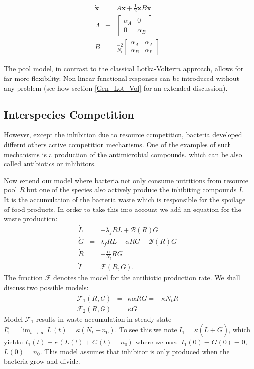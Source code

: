 \documentclass[10pt,A4paper]{article}
\begin{document}
\begin{eqnarray}
\dot{\mathbf{x}}&=&A\mathbf{x}+\frac{1}{2}\mathbf{x}B\mathbf{x}\\
A&=&
\begin{bmatrix}
\alpha_A&0\\
0 &\alpha_B
\end{bmatrix}\\
B&=&
\frac{-2}{N_t}\begin{bmatrix}
\alpha_A&\alpha_A\\
\alpha_B &\alpha_B
\end{bmatrix}
\end{eqnarray}

The pool model, in contrast to the classical Lotka-Volterra approach, allows for far more flexibility. 
Non-linear functional responses can be introduced without any problem (see how section \ref{Gen_Lot_Vol} for an extended discussion).


\subsection{Interspecies Competition}

However, except the inhibition due to resource competition, bacteria developed differnt others active competition mechanisms.
One of the examples of such mechanisms is a production of the antimicrobial compounds, which can be also called antibiotics or inhibitors.


Now extend our model where bacteria not only consume nutritions from resource pool $R$ but one of the species also actively produce the inhibiting compounds $I$. 
It is the accumulation of the bacteria waste which is responsible for the spoilage of food products. 
In order to take this into account we add an equation for the waste production:
\begin{eqnarray}
\dot{L} &=& - \lambda_f R L + \mathcal{B}(R)G\\
\dot{G} &=& \lambda_f R L +\alpha R G-\mathcal{B}(R)G\\
\dot{R} &=&-\frac{\alpha}{N_t} R G\\
\dot{I} &=& \mathcal{F}(R,G).
\end{eqnarray}
The function $\mathcal{F}$ denotes the model for the antibiotic production rate. 
We shall discuss two possible models:
\begin{eqnarray}
\mathcal{F}_1(R,G)&=&\kappa\alpha R G=-\kappa N_t\dot{R}\\
\mathcal{F}_2(R,G)&=&\kappa G
\end{eqnarray}
Model $\mathcal{F}_1$ results in waste accumulation in steady state $I_1^s=\lim_{t\to\infty}I_1(t)=\kappa(N_t-n_0)$. 
To see this we note $\dot{I}_1=\kappa(\dot{L}+\dot{G})$, which yields: $I_1(t)=\kappa(L(t)+G(t)-n_0)$ where we used $I_1(0)=G(0)=0$, $L(0)=n_0$. 
This model assumes that inhibitor is only produced when the bacteria grow and divide. \\
\end{document}
